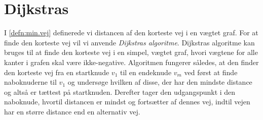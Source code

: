 \section{Dijkstras}
I \ref{defn:min.vej} definerede vi distancen af den korteste vej i en vægtet graf. For at finde den korteste vej vil vi anvende \emph{Dijkstras algoritme}. Dijkstras algoritme kan bruges til at finde den korteste vej i en simpel, vægtet graf, hvori vægtene for alle kanter i grafen skal være ikke-negative. Algoritmen fungerer således, at den finder den korteste vej fra en startknude $v_{1}$ til en endeknude $v_{m}$ ved først at finde naboknuderne til $v_{1}$ og undersøge hvilken af disse, der har den mindste distance og altså er tættest på startknuden. Derefter tager den udgangspunkt i den naboknude, hvortil distancen er mindst og fortsætter af dennes vej, indtil vejen har en større distance end en alternativ vej.

